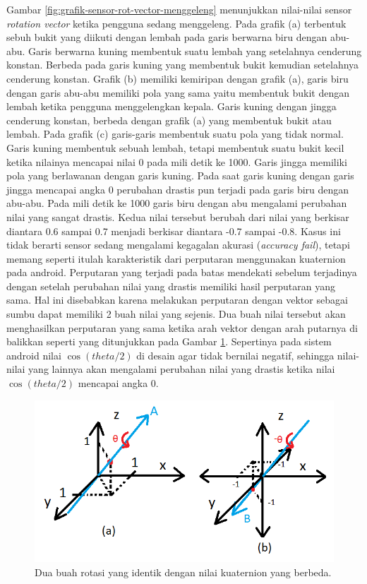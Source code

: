 Gambar \ref{fig:grafik-sensor-rot-vector-menggeleng} menunjukkan nilai-nilai sensor \textit{rotation vector} ketika pengguna sedang menggeleng. Pada grafik (a) terbentuk sebuh bukit yang diikuti dengan lembah pada garis berwarna biru dengan abu-abu. Garis berwarna kuning membentuk suatu lembah yang setelahnya cenderung konstan. Berbeda pada garis kuning yang membentuk bukit kemudian setelahnya cenderung konstan. Grafik (b) memiliki kemiripan dengan grafik (a), garis biru dengan garis abu-abu memiliki pola yang sama yaitu membentuk bukit dengan lembah ketika pengguna menggelengkan kepala. Garis kuning dengan jingga cenderung konstan, berbeda dengan grafik (a) yang membentuk bukit atau lembah. Pada grafik (c) garis-garis membentuk suatu pola yang tidak normal. Garis kuning membentuk sebuah lembah, tetapi membentuk suatu bukit kecil ketika nilainya mencapai nilai 0 pada mili detik ke 1000. Garis jingga memiliki pola yang berlawanan dengan garis kuning. Pada saat garis kuning dengan garis jingga mencapai angka 0 perubahan drastis pun terjadi pada garis biru dengan abu-abu. Pada mili detik ke 1000 garis biru dengan abu mengalami perubahan nilai yang sangat drastis. Kedua nilai tersebut berubah dari nilai yang berkisar diantara 0.6 sampai 0.7 menjadi berkisar diantara -0.7 sampai -0.8. Kasus ini tidak berarti sensor sedang mengalami kegagalan akurasi (\textit{accuracy fail}), tetapi memang seperti itulah karakteristik dari perputaran menggunakan kuaternion pada android. Perputaran yang terjadi pada batas mendekati sebelum terjadinya dengan setelah perubahan nilai yang drastis memiliki hasil perputaran yang sama. Hal ini disebabkan karena melakukan perputaran dengan vektor sebagai sumbu dapat memiliki 2 buah nilai yang sejenis. Dua buah nilai tersebut akan menghasilkan perputaran yang sama ketika arah vektor dengan arah putarnya di balikkan seperti yang ditunjukkan pada Gambar \ref{fig:penjelasan-perputaran-quaternion-android-sensor}. Sepertinya pada sistem android nilai $\cos (theta/2)$ di desain agar tidak bernilai negatif, sehingga nilai-nilai yang lainnya akan mengalami perubahan nilai yang drastis ketika nilai $\cos (theta/2)$ mencapai angka 0.


\begin{figure}[htbp]
\centering
\includegraphics[scale=0.6]{Gambar/penjelasan-perputaran-quaternion-android-sensor.png}
\caption{Dua buah rotasi yang identik dengan nilai kuaternion yang berbeda.} 
\label{fig:penjelasan-perputaran-quaternion-android-sensor}
\end{figure}

